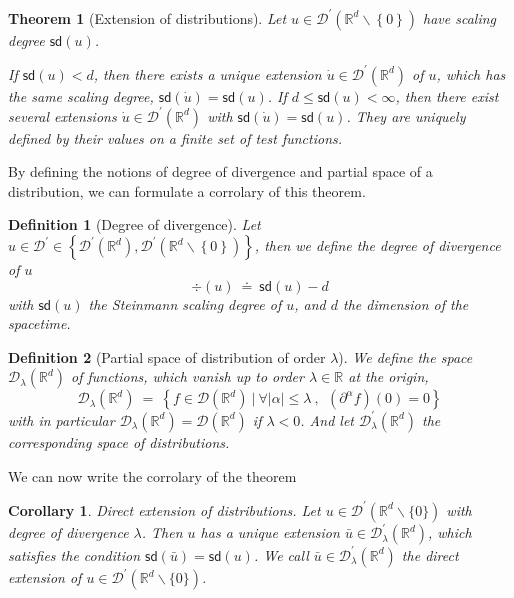 \documentclass[10pt]{book}
\newcommand{\sd}{\mathsf{sd}}
\newcommand{\abs}[1]{\left|#1\right|}
\newcommand{\Dcal}{\mathcal{D}}
\newcommand{\Rbb}{\mathbb{R}}
\theoremstyle{break}
\newtheorem{theorem}{Theorem}
\newtheorem{corollary}{Corollary}
\newtheorem{definition}{Definition}
\begin{document}
\begin{theorem}[Extension of distributions]
 Let $u \in \Dcal^\prime(\Rbb^d \backslash\left\{ 0\right\} )$ have scaling degree $\sd(u)$.
 
  If $\sd(u)<d$, then there exists a unique extension $\dot{u} \in \Dcal^\prime(\Rbb^d)$ of $u$, which has the same scaling degree, $\sd(\dot{u})=\sd(u)$.
  If $d\leq\sd(u)<\infty$, then there exist several extensions $\dot{u} \in \Dcal^\prime(\mathbb{R}^{d})$ with $\sd(\dot{u})=\sd(u)$. They are uniquely defined by their values on a finite set of test functions.

\end{theorem}

By defining the notions of degree of divergence and  partial space of a distribution, we can formulate a corrolary of this theorem.

\begin{definition}[Degree of divergence]
 Let $u \in \Dcal^\prime \in \left\{ \Dcal^\prime(\mathbb{R}^{d}),\Dcal^\prime(\mathbb{R}^{d}\backslash\left\{ 0\right\} )\right\} $,
 then we define the degree of divergence of $u$
 \begin{equation*}
  \div(u) \ \doteq \ \sd(u)-d 
 \end{equation*}
 with $\sd(u)$ the Steinmann scaling degree of $u$, and $d$ the dimension of the spacetime.  
\end{definition}

\begin{definition}[Partial space of distribution of order $\lambda$]
 We define the space $\Dcal_{\lambda}(\Rbb^d)$ of functions, which vanish up to order $\lambda \in \Rbb$ at the origin, 
 \begin{equation*}
  \Dcal_{\lambda}(\Rbb^d) \ = \ \left\{ f \in \Dcal(\Rbb^d) \ | \ \forall \abs{\alpha} \leq \lambda\ , \ \ \left(\partial^{\alpha}f\right)(0)=0 \right\} 
 \end{equation*}
 with in particular $\Dcal_\lambda(\Rbb^d) = \Dcal(\Rbb^d)$ if $\lambda < 0$. And let $\Dcal^\prime_\lambda(\Rbb^d)$ the corresponding space of distributions. 
\end{definition}

We can now write the corrolary of the theorem

\begin{corollary} \emph{Direct extension of distributions.} 
 Let $u \in \Dcal^\prime (\Rbb^d \backslash \{0\} )$ with degree of divergence $\lambda$. Then $u$ has a unique extension $\bar{u} \in \Dcal_\lambda^\prime(\Rbb^d)$, which satisfies the condition $\sd(\bar{u}) = \sd(u)$. We call $\bar{u} \in \Dcal_\lambda^\prime(\Rbb^d)$ the direct extension of $u  \in \Dcal^\prime(\Rbb^d \backslash \{0\})$. 
\end{corollary}
\end{document}
